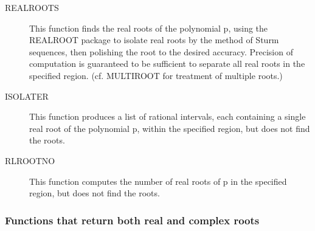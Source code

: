 \begin{description}
 
\item[REALROOTS] This function finds the real roots of the polynomial p,
using the REALROOT package to isolate real roots by the method of Sturm
sequences, then polishing the root to the desired accuracy.  Precision
of computation is guaranteed to be sufficient to separate all real roots
in the specified region.  (cf. MULTIROOT for treatment of multiple
roots.)

\item[ISOLATER] This function produces a list of rational intervals, each
containing a single real root of the polynomial p, within the specified
region, but does not find the roots.

\item[RLROOTNO] This function computes the number of real roots of p in
the specified region, but does not find the roots.
\end{description}

\subsubsection{Functions that return both real and complex roots}

